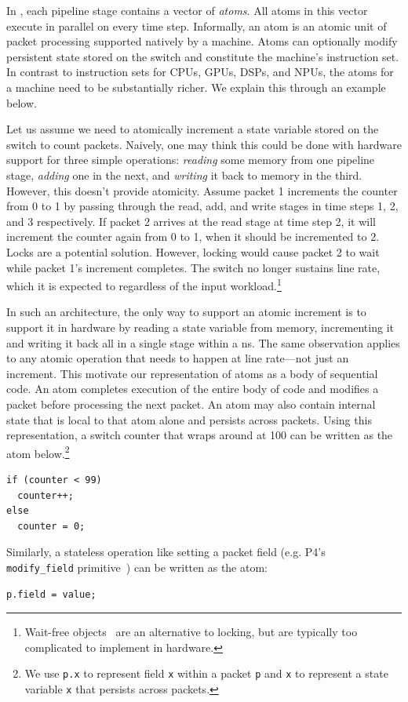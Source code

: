 In \absmachine, each pipeline stage contains a vector of \textit{atoms}. All
atoms in this vector execute in parallel on every time step.  Informally, an
atom is an atomic unit of packet processing supported natively by a \absmachine
machine. Atoms can optionally modify persistent state stored on the switch
and constitute the machine's instruction set.  In contrast to instruction sets for
CPUs, GPUs, DSPs, and NPUs, the atoms for a \absmachine machine need to be
substantially richer. We explain this through an example below.

Let us assume we need to atomically increment a state variable stored on the
switch to count packets. Naively, one may think this could be done with
hardware support for three simple operations: \textit{reading} some memory from
one pipeline stage, \textit{adding} one in the next, and \textit{writing} it
back to memory in the third. However, this doesn't provide atomicity. Assume
packet 1 increments the counter from 0 to 1 by passing through the read, add,
and write stages in time steps 1, 2, and 3 respectively.  If packet 2 arrives
at the read stage at time step 2, it will increment the counter again from 0 to
1, when it should be incremented to 2. Locks are a potential solution. However,
locking would cause packet 2 to wait while packet 1's increment completes. The
switch no longer sustains line rate, which it is expected to regardless of the
input workload.\footnote{Wait-free objects~\cite{herlihy_wait} are an
alternative to locking, but are typically too complicated to implement in
hardware.}

In such an architecture, the only way to support an atomic increment is to
support it in hardware by reading a state variable from memory, incrementing it
and writing it back all in a single stage within a ns. The same observation
applies to any atomic operation that needs to happen at line rate---not just an
increment.  This motivate our representation of atoms as a body of sequential
code. An atom completes execution of the entire body of code and modifies a
packet before processing the next packet.  An atom may also contain internal
state that is local to that atom alone and persists across packets.  Using this
representation, a switch counter that wraps around at 100 can be written as the
atom below.\footnote{We use {\tt p.x} to represent field {\tt x} within a
  packet {\tt p} and {\tt x} to represent a state variable {\tt x} that
  persists across packets.}
\begin{lstlisting}[style=customc, numbers=none, frame=none]
if (counter < 99)
  counter++;
else
  counter = 0;
\end{lstlisting}
Similarly, a stateless operation like setting a packet field (e.g. P4's {\tt
modify\_field} primitive~\cite{p4spec}) can be written as the atom:
\begin{lstlisting}[style=customc, numbers=none, frame=none]
  p.field = value;
\end{lstlisting}

